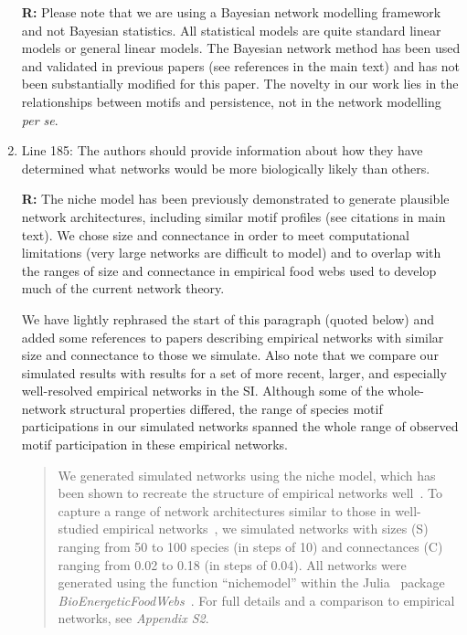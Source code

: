 \documentclass[12pt]{article}
\begin{document}
\begin{enumerate}
                \textbf{R:} Please note that we are using a Bayesian network modelling framework and not Bayesian statistics. All statistical models are quite standard linear models or general linear models. The Bayesian network method has been used and validated in previous papers (see references in the main text) and has not been substantially modified for this paper. The novelty in our work lies in the relationships between motifs and persistence, not in the network modelling \emph{per se}.


            \item Line 185: The authors should provide information about how they have determined what networks would be more biologically likely than others.

                \textbf{R:} The niche model has been previously demonstrated to generate plausible network architectures, including similar motif profiles (see citations in main text). We chose size and connectance in order to meet computational limitations (very large networks are difficult to model) and to overlap with the ranges of size and connectance in empirical food webs used to develop much of the current network theory. 


                We have lightly rephrased the start of this paragraph (quoted below) and added some references to papers describing empirical networks with similar size and connectance to those we simulate.
                Also note that we compare our simulated results with results for a set of more recent, larger, and especially well-resolved empirical networks in the SI. Although some of the whole-network structural properties differed, the range of species motif participations in our simulated networks spanned the whole range of observed motif participation in these empirical networks.


                \begin{quotation}
                We generated simulated networks using the niche model, which has been shown to recreate the structure of empirical networks well~\citep{Williams2000,Stouffer2007}.
                To capture a range of network architectures similar to those in well-studied empirical networks~\citep{Dunne2002,Dunne2002a}, we simulated networks with sizes (S) ranging from 50 to 100 species (in steps of 10) and connectances (C) ranging from 0.02 to 0.18 (in steps of 0.04). 
                All networks were generated using the function ``nichemodel'' within the Julia~\citep{Bezanson2017julia} package \emph{BioEnergeticFoodWebs}~\citep{bioenergfw,Delmas2017}.   
                For full details and a comparison to empirical networks, see \emph{Appendix S2}.
                \end{quotation}



\end{enumerate}
\end{document}
